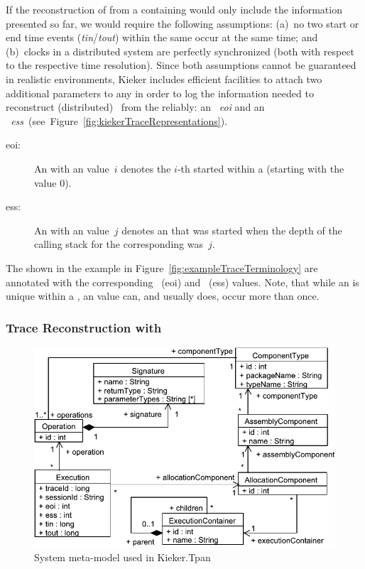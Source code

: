If the reconstruction of \traces{} from a \MonitoringLog{} containing \KiekerExecutionRecords{} %
would only include the \trace{} information presented so far, we would require the %
following assumptions: %
(a)~no two \execution{} start or end time events %
(\textit{tin}/\textit{tout}) within the same \trace{} occur at the same time; %
and (b)~clocks in a distributed system are perfectly synchronized (both with %
respect to the respective time resolution). %
Since both assumptions cannot be guaranteed in realistic environments, %
Kieker includes efficient facilities to attach two additional parameters to any %
\KiekerExecutionRecord{} in order to log the information needed to %
reconstruct (distributed)~\traces{} from the \MonitoringLog{} reliably: %
an \textit{\eoiLong{}~eoi} and an \textit{\essLong{}~ess}~(see~Figure~\ref{fig:kiekerTraceRepresentations}). %
\begin{description}
\item[eoi:] An \execution{} with an \eoiLong{} value~$i$ denotes the $i$-th %
\execution{} started within a \trace{} (starting with the value $0$).
\item[ess:] An \execution{} with an \essLong{} value~$j$ denotes an \execution{} that %
was started when the depth of the calling stack for the corresponding \trace{} was~$j$.
\end{description}

\noindent The \executions{} shown in the example \trace{} in Figure~\ref{fig:exampleTraceTerminology} 
are annotated with the corresponding \eoiLong{}~(eoi) and \essLong{}~(ess) values. %
Note, that while an \eoiLong{} is unique within a \trace{}, an \essLong{} %
value can, and usually does, occur more than once. %

\subsubsection{Trace Reconstruction with \KiekerTpan{}}

\begin{figure}\centering
\includegraphics[scale=0.65]{figures/model/kieker_systemmodel-crop}
\caption{System meta-model used in Kieker.Tpan}
\end{figure}


